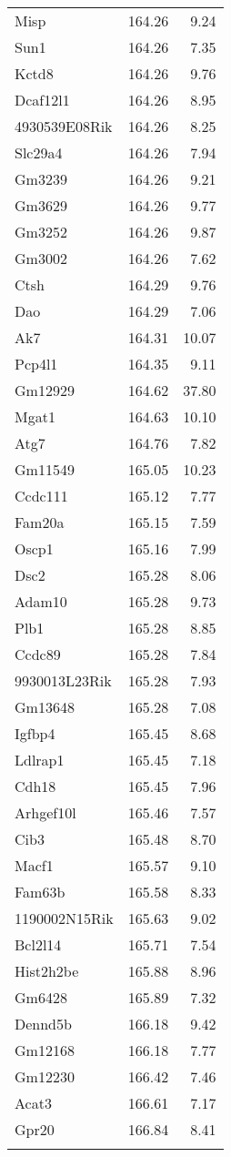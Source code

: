 \documentclass[oneside]{book}
\begin{document}
{\begin{longtable}{lrr}
  Misp & 164.26 & 9.24 \\
  Sun1 & 164.26 & 7.35 \\
  Kctd8 & 164.26 & 9.76 \\
  Dcaf12l1 & 164.26 & 8.95 \\
  4930539E08Rik & 164.26 & 8.25 \\
  Slc29a4 & 164.26 & 7.94 \\
  Gm3239 & 164.26 & 9.21 \\
  Gm3629 & 164.26 & 9.77 \\
  Gm3252 & 164.26 & 9.87 \\
  Gm3002 & 164.26 & 7.62 \\
  Ctsh & 164.29 & 9.76 \\
  Dao & 164.29 & 7.06 \\
  Ak7 & 164.31 & 10.07 \\
  Pcp4l1 & 164.35 & 9.11 \\
  Gm12929 & 164.62 & 37.80 \\
  Mgat1 & 164.63 & 10.10 \\
  Atg7 & 164.76 & 7.82 \\
  Gm11549 & 165.05 & 10.23 \\
  Ccdc111 & 165.12 & 7.77 \\
  Fam20a & 165.15 & 7.59 \\
  Oscp1 & 165.16 & 7.99 \\
  Dsc2 & 165.28 & 8.06 \\
  Adam10 & 165.28 & 9.73 \\
  Plb1 & 165.28 & 8.85 \\
  Ccdc89 & 165.28 & 7.84 \\
  9930013L23Rik & 165.28 & 7.93 \\
  Gm13648 & 165.28 & 7.08 \\
  Igfbp4 & 165.45 & 8.68 \\
  Ldlrap1 & 165.45 & 7.18 \\
  Cdh18 & 165.45 & 7.96 \\
  Arhgef10l & 165.46 & 7.57 \\
  Cib3 & 165.48 & 8.70 \\
  Macf1 & 165.57 & 9.10 \\
  Fam63b & 165.58 & 8.33 \\
  1190002N15Rik & 165.63 & 9.02 \\
  Bcl2l14 & 165.71 & 7.54 \\
  Hist2h2be & 165.88 & 8.96 \\
  Gm6428 & 165.89 & 7.32 \\
  Dennd5b & 166.18 & 9.42 \\
  Gm12168 & 166.18 & 7.77 \\
  Gm12230 & 166.42 & 7.46 \\
  Acat3 & 166.61 & 7.17 \\
  Gpr20 & 166.84 & 8.41 \\
   \hline
  
  \label{tab:hot-annot}

\end{longtable}
}
\end{document}
